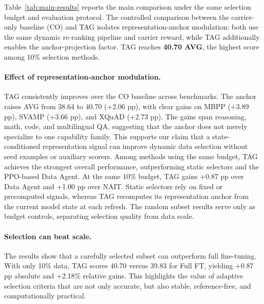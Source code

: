 Table~\ref{tab:main-results} reports the main comparison under the same
selection budget and evaluation protocol. The controlled comparison
between the carrier-only baseline (CO) and \textsc{TAG} isolates
representation-anchor modulation: both use the same dynamic re-ranking
pipeline and carrier reward, while \textsc{TAG} additionally enables
the anchor-projection factor. \textsc{TAG} reaches \textbf{40.70 AVG}, the highest
score among 10\% selection methods.

\paragraph{Effect of representation-anchor modulation.}
\textsc{TAG} consistently improves over the CO baseline across
benchmarks. The anchor raises AVG from 38.64 to 40.70
(+2.06 pp), with clear gains on MBPP (+3.89 pp), SVAMP (+3.66 pp),
and XQuAD (+2.73 pp). The gains span reasoning, math, code, and
multilingual QA, suggesting that the anchor does not merely
specialize to one capability family. This supports our claim that a
state-conditioned representation signal can improve dynamic data
selection without seed examples or auxiliary scorers. Among methods
using the same budget, \textsc{TAG}
achieves the strongest overall performance, outperforming static
selectors and the PPO-based Data Agent. At the same 10\% budget,
\textsc{TAG} gains +0.87 pp over Data Agent and +1.00 pp over
NAIT. Static selectors rely on fixed or precomputed signals, whereas
\textsc{TAG} recomputes its representation anchor from the current
model state at each refresh. The random subset results serve only as
budget controls,
separating selection quality from data scale.

\paragraph{Selection can beat scale.}
The results show that a carefully selected subset can outperform full
fine-tuning. With only 10\% data, \textsc{TAG} scores 40.70 versus
39.83 for Full FT, yielding +0.87 pp absolute and +2.18\% relative
gains. This highlights the value of adaptive selection criteria that
are not only accurate, but also stable, reference-free, and
computationally practical.


